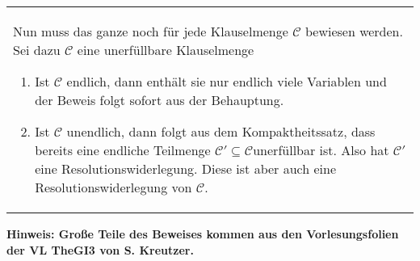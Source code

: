 \documentclass[a4paper,10pt]{article}
\newcommand{\tabspace}{15cm}
\begin{document}
\begin{tabular}{@{} p{\tabspace}}
Nun muss das ganze noch für jede Klauselmenge $\mathcal{C}$ bewiesen werden. Sei dazu $\mathcal{C}$ eine unerfüllbare Klauselmenge
\begin{enumerate}
	\item Ist $\mathcal{C}$ endlich, dann enthält sie nur endlich viele Variablen und der Beweis folgt sofort aus der Behauptung. 
	\item Ist $\mathcal{C}$ unendlich, dann folgt aus dem Kompaktheitssatz, dass bereits eine endliche Teilmenge $\mathcal{C}'\subseteq \mathcal{C} $unerfüllbar ist. Also hat $\mathcal{C}'$ eine Resolutionswiderlegung. Diese ist aber auch eine Resolutionswiderlegung von $\mathcal{C}$.	
\end{enumerate}
\end{tabular}

\textbf{Hinweis: Große Teile des Beweises kommen aus den Vorlesungsfolien der VL TheGI3 von S. Kreutzer. }
\end{document}
